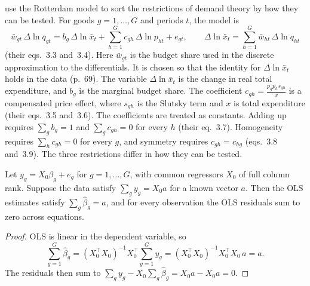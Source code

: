 \citet[Section~3.3, pp.~67--70]{DeatonMuellbauer1980b} use the Rotterdam model to sort the restrictions of demand
theory by how they can be tested. For goods $g = 1, \dots, G$ and periods $t$, the model is
\begin{equation}\label{eq:A-rotterdam}
\bar w_{gt}\,\Delta\ln q_{gt} = b_g\,\Delta\ln\bar x_t + \sum_{h=1}^{G}c_{gh}\,\Delta\ln p_{ht} + e_{gt},
\qquad \Delta\ln\bar x_t = \sum_{h=1}^{G}\bar w_{ht}\,\Delta\ln q_{ht}
\end{equation}
(their eqs.~3.3 and~3.4). Here $\bar w_{gt}$ is the budget share used in the discrete approximation to the
differentials. It is chosen so that the identity for $\Delta\ln\bar x_t$ holds in the data (p.~69). The variable
$\Delta\ln\bar x_t$ is the change in real total expenditure, and $b_g$ is the marginal budget share. The coefficient
$c_{gh} = \frac{p_gp_hs_{gh}}{x}$ is a compensated price effect, where $s_{gh}$ is the Slutsky term and $x$ is total
expenditure (their eqs.~3.5 and~3.6). The coefficients are treated as constants. Adding up requires
$\sum_gb_g = 1$ and $\sum_gc_{gh} = 0$ for every $h$ (their eq.~3.7). Homogeneity requires $\sum_hc_{gh} = 0$ for
every $g$, and symmetry requires $c_{gh} = c_{hg}$ (eqs.~3.8 and~3.9). The three restrictions differ in how they
can be tested.

\begin{proposition}\label{prop:A-addingup}
Let $y_g = X_0\beta_g + e_g$ for $g = 1, \dots, G$, with common regressors $X_0$ of full column rank. Suppose the
data satisfy $\sum_gy_g = X_0a$ for a known vector $a$. Then the OLS estimates satisfy $\sum_g\hat\beta_g = a$, and
for every observation the OLS residuals sum to zero across equations.
\end{proposition}

\begin{proof}
OLS is linear in the dependent variable, so
\begin{equation*}
\sum_{g=1}^{G}\hat\beta_g = (X_0^\top X_0)^{-1}X_0^\top\sum_{g=1}^{G}y_g = (X_0^\top X_0)^{-1}X_0^\top X_0\,a = a .
\end{equation*}
The residuals then sum to $\sum_gy_g - X_0\sum_g\hat\beta_g = X_0a - X_0a = 0$.
\end{proof}

